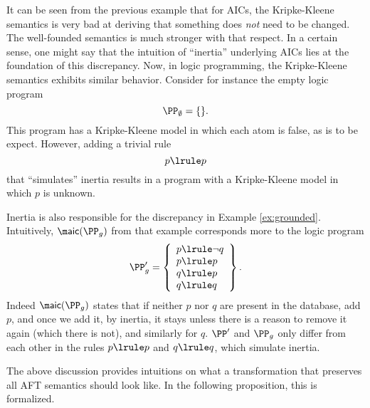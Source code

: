 It can be seen from the previous example that for AICs, the Kripke-Kleene semantics is very bad at deriving that something does \emph{not} need to be changed. The well-founded semantics is much stronger with that respect. 
In a certain sense, one might say that the intuition of ``inertia'' underlying AICs lies at the foundation of this discrepancy. 
Now, in logic programming, the Kripke-Kleene semantics exhibits similar behavior. Consider for instance the empty logic program 
\[ \PP_\emptyset = \{ \}.\]
This program has a Kripke-Kleene model in which each atom is false, as is to be expect. 
However, adding a trivial rule
\[p\lrule p\]
 that ``simulates'' inertia results in a program with a Kripke-Kleene model in which $p$ is unknown.
 
 Inertia is also responsible for the discrepancy in Example \ref{ex:grounded}. 
 Intuitively, $\aicop(\PP_g)$ from that example corresponds more to the logic program
  \[\PP_g' = \left\{\begin{array}{l}p\lrule \lnot q \\ p\lrule p \\ q\lrule p\\ q\lrule q  \end{array}\right\}.\]
  Indeed $\aicop(\PP_g)$ states that if neither  $p$ nor $q$ are present in the database, add $p$, and once we add it, by inertia, it stays unless there is a reason to remove it again (which there is not), and similarly for $q$. 
  $\PP'$ and $\PP_g$ only differ from each other in the rules $p\lrule p$ and $q\lrule q$, which simulate inertia.
 
 
 The above discussion provides intuitions on what a transformation that preserves all AFT semantics should look like. In the following proposition, this is formalized. 

  


